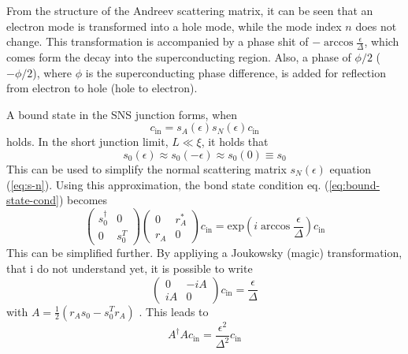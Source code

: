 From the structure of the Andreev scattering matrix, it can be seen that an electron mode is transformed into a hole mode, while the mode index $n$ does not change. This transformation is accompanied by a phase shit of $- \arccos \frac{\epsilon}{\Delta} $, which comes form the decay into the superconducting region. Also, a phase of $\phi/2$ ($-\phi/2$), where $\phi$ is the superconducting phase difference, is added for reflection from electron to hole (hole to electron).


A bound state in the SNS junction forms, when 
\begin{equation}
c_\text{in} = s_A ( \epsilon ) s_N ( \epsilon ) c_\text{in} \label{eq:bound-state-cond}
\end{equation}
holds. In the short junction limit, $L \ll \xi$, it holds that
\begin{equation}
s_0 ( \epsilon ) \approx s_0 ( - \epsilon ) \approx s_0 ( 0) \equiv s_0
\end{equation}
This can be used to simplify the normal scattering matrix $s_N (\epsilon) $ equation (\ref{eq:s-n}). Using this approximation, the bond state condition eq. (\ref{eq:bound-state-cond}) becomes
\begin{equation}
\begin{pmatrix} s_0^\dagger & 0\\ 0 & s_0^T \end{pmatrix}  \begin{pmatrix} 0 & r_A^* \\ r_A & 0 \end{pmatrix}  c_\text{in} = \text{exp} \left( i \arccos \frac{\epsilon}{\Delta} \right) c_\text{in}
\end{equation}
This can be simplified further. By appliying a Joukowsky (magic) transformation, that i do not understand yet, it is possible to write
\begin{equation}
\begin{pmatrix} 0 & - i A \\ i A & 0 \end{pmatrix} c_\text{in} = \frac{\epsilon}{\Delta}
\end{equation}
with $A = \frac{1}{2} ( r_A s_0 - s_0^T r_A)$ . This leads  to
\begin{equation}
A^\dagger A c_\text{in} = \frac{\epsilon^2}{\Delta^2} c_\text{in} \label{eq:bound-state-final}
\end{equation}

